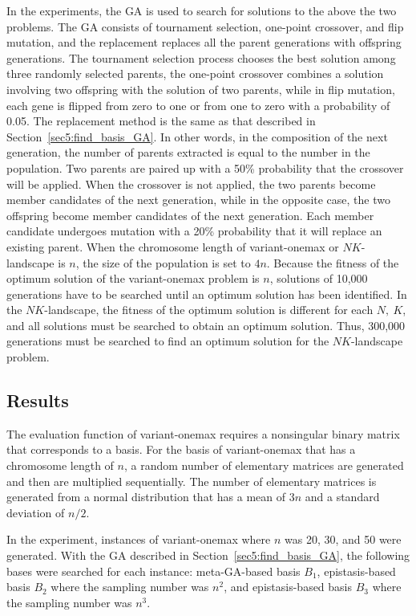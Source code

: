 In the experiments, the GA is used to search for solutions to the above the two problems. The GA consists of tournament selection, one-point crossover, and flip mutation, and the replacement replaces all the parent generations with offspring generations. The tournament selection process chooses the best solution among three randomly selected parents, the one-point crossover combines a solution involving two offspring with the solution of two parents, while in flip mutation, each gene is flipped from zero to one or from one to zero with a probability of 0.05. The replacement method is the same as that described in Section~\ref{sec5:find_basis_GA}. In other words, in the composition of the next generation, the number of parents extracted is equal to the number in the population. Two parents are paired up with a 50\% probability that the crossover will be applied. When the crossover is not applied, the two parents become member candidates of the next generation, while in the opposite case, the two offspring become member candidates of the next generation. Each member candidate undergoes mutation with a 20\% probability that it will replace an existing parent. When the chromosome length of variant-onemax or $ NK $-landscape is $ n $, the size of the population is set to $ 4n $. Because the fitness of the optimum solution of the variant-onemax problem is $ n $, solutions of 10,000 generations have to be searched until an optimum solution has been identified. In the $ NK $-landscape, the fitness of the optimum solution is different for each $ N,\ K $, and all solutions must be searched to obtain an optimum solution. Thus, 300,000 generations must be searched to find an optimum solution for the $ NK $-landscape problem.

\subsection{Results}
The evaluation function of variant-onemax requires a nonsingular binary matrix that corresponds to a basis. For the basis of variant-onemax that has a chromosome length of $ n $, a random number of elementary matrices are generated and then are multiplied sequentially. The number of elementary matrices is generated from a normal distribution that has a mean of $ 3n $ and a standard deviation of $ n/2 $.

In the experiment, instances of variant-onemax where $ n $ was 20, 30, and 50 were generated. With the GA described in Section~\ref{sec5:find_basis_GA}, the following bases were searched for each instance: meta-GA-based basis $ B_1 $, epistasis-based basis $ B_2 $ where the sampling number was $ n^2 $, and epistasis-based basis $ B_3 $ where the sampling number was $ n^3 $.

